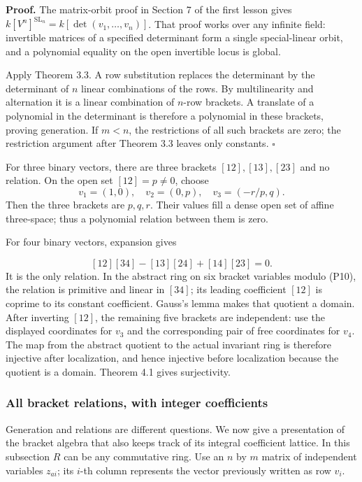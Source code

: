 \documentclass[
]{article}
\begin{document}
\textbf{Proof.} The matrix-orbit proof in Section 7 of the first lesson
gives \(k [V^n]^{\operatorname{SL}_n}=k [\det(v_1,\ldots,v_n)]\). That
proof works over any infinite field: invertible matrices of a specified
determinant form a single special-linear orbit, and a polynomial
equality on the open invertible locus is global.

Apply Theorem 3.3. A row substitution replaces the determinant by the
determinant of \(n\) linear combinations of the rows. By multilinearity
and alternation it is a linear combination of \(n\)-row brackets. A
translate of a polynomial in the determinant is therefore a polynomial
in these brackets, proving generation. If \(m<n\), the restrictions of
all such brackets are zero; the restriction argument after Theorem 3.3
leaves only constants. \(\square\)

For three binary vectors, there are three brackets \([12],[13],[23]\)
and no relation. On the open set \([12]=p\ne0\), choose \[
v_1=(1,0),\quad v_2=(0,p),\quad
v_3=(-r/p,q).
\] Then the three brackets are \(p,q,r\). Their values fill a dense open
set of affine three-space; thus a polynomial relation between them is
zero.

For four binary vectors, expansion gives
\protect{}\label{equation-P10}{}

\[
[12][34]-[13][24]+[14][23]=0.
\tag{P10}
\] It is the only relation. In the abstract ring on six bracket
variables modulo (P10), the relation is primitive and linear in
\([34]\); its leading coefficient \([12]\) is coprime to its constant
coefficient. Gauss's lemma makes that quotient a domain. After inverting
\([12]\), the remaining five brackets are independent: use the displayed
coordinates for \(v_3\) and the corresponding pair of free coordinates
for \(v_4\). The map from the abstract quotient to the actual invariant
ring is therefore injective after localization, and hence injective
before localization because the quotient is a domain. Theorem 4.1 gives
surjectivity.

\subsubsection{All bracket relations, with integer
coefficients}\label{all-bracket-relations-with-integer-coefficients}

Generation and relations are different questions. We now give a
presentation of the bracket algebra that also keeps track of its
integral coefficient lattice. In this subsection \(R\) can be any
commutative ring. Use an \(n\) by \(m\) matrix of independent variables
\(z_{ai}\); its \(i\)-th column represents the vector previously written
as row \(v_i\).
\end{document}
